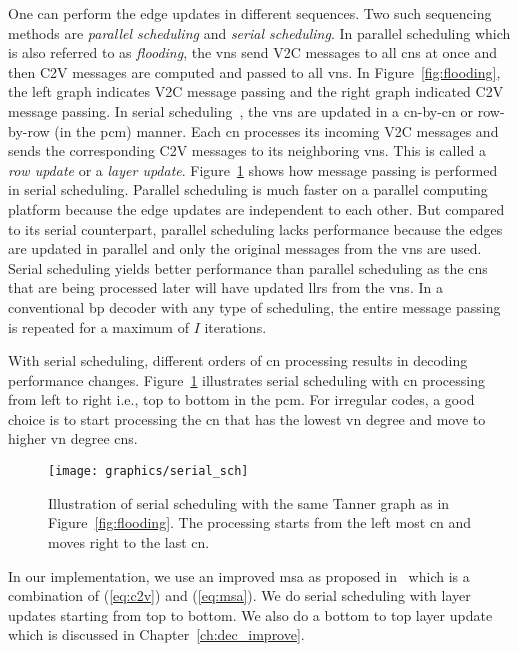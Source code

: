 One can perform the edge updates in different sequences. Two such sequencing methods are \emph{parallel scheduling} and \emph{serial scheduling}. In parallel scheduling which is also referred to as \emph{flooding}, the \glspl{vn} send V2C messages to all \glspl{cn} at once and then C2V messages are computed and passed to all \glspl{vn}. In Figure~\ref{fig:flooding}, the left graph indicates V2C message passing and the right graph indicated C2V message passing. In serial scheduling~\cite{Zhang2002}, the \glspl{vn} are updated in a \gls{cn}-by-\gls{cn} or row-by-row (in the \gls{pcm}) manner. Each \gls{cn} processes its incoming V2C messages and sends the corresponding C2V messages to its neighboring \glspl{vn}. This is called a \emph{row update} or a \emph{layer update}. Figure~\ref{fig:serial_sch} shows how message passing is performed in serial scheduling. Parallel scheduling is much faster on a parallel computing platform because the edge updates are independent to each other. But compared to its serial counterpart, parallel scheduling lacks performance because the edges are updated in parallel and only the original messages from the \glspl{vn} are used. Serial scheduling yields better performance than parallel scheduling as the \glspl{cn} that are being processed later will have updated \glspl{llr} from the \glspl{vn}. In a conventional \gls{bp} decoder with any type of scheduling, the entire message passing is repeated for a maximum of $I$ iterations.

With serial scheduling, different orders of \gls{cn} processing results in decoding performance changes. Figure~\ref{fig:serial_sch} illustrates serial scheduling with \gls{cn} processing from left to right i.e., top to bottom in the \gls{pcm}. For irregular codes, a good choice is to start processing the \gls{cn} that has the lowest \gls{vn} degree and move to higher \gls{vn} degree \glspl{cn}.

\begin{figure}[htbp]
  \centering
  \texttt{[image: graphics/serial\_sch]}
  \caption{Illustration of serial scheduling with the same Tanner graph as in Figure~\ref{fig:flooding}. The processing starts from the left most \gls{cn} and moves right to the last \gls{cn}.}
  \label{fig:serial_sch}
\end{figure}

In our implementation, we use an improved \gls{msa} as proposed in~\cite{Jones2003} which is a combination of (\ref{eq:c2v}) and (\ref{eq:msa}). We do serial scheduling with layer updates starting from top to bottom. We also do a bottom to top layer update which is discussed in Chapter~\ref{ch:dec_improve}.

